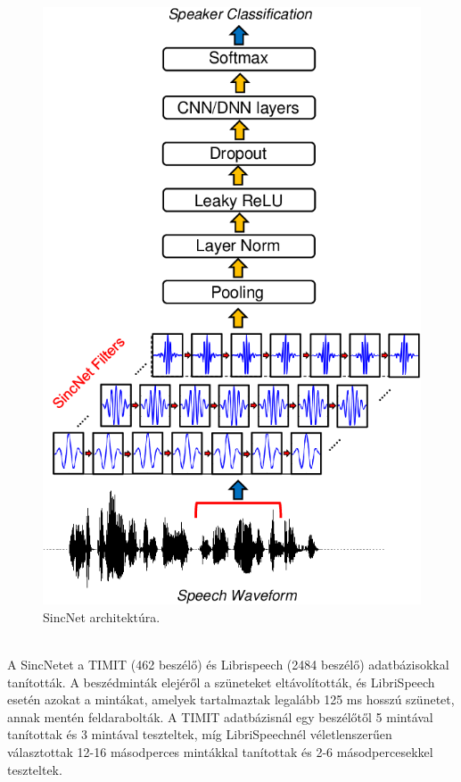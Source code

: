 \begin{figure}[!ht]
	\centering
	\includegraphics[width=150mm, keepaspectratio]{figures/sincnet-nn.png}
	\caption{SincNet architektúra.}
	\label{fig:sincnet-nn}
\end{figure}
\ \\
\newline
\newline
A SincNetet a TIMIT (462 beszélő) és Librispeech (2484 beszélő) adatbázisokkal tanították.
A beszédminták elejéről a szüneteket eltávolították, és LibriSpeech esetén azokat a mintákat, amelyek tartalmaztak legalább 125 ms hosszú szünetet, annak mentén feldarabolták. A TIMIT adatbázisnál egy beszélőtől 5 mintával tanítottak és 3 mintával teszteltek, míg LibriSpeechnél véletlenszerűen választottak 12-16 másodperces mintákkal tanítottak és 2-6 másodpercesekkel teszteltek.
